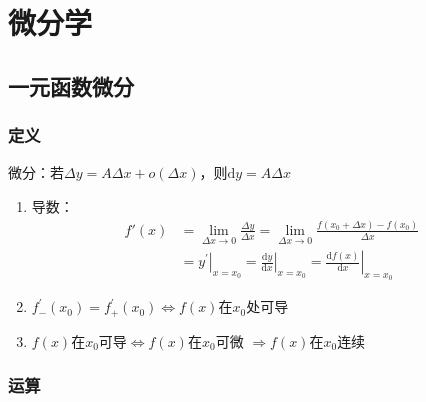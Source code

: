 \documentclass[12pt]{book}
\begin{document}
\chapter{微分学}

\section{一元函数微分}



\subsection{定义}

微分：若$\Delta y =A \Delta x +o(\Delta x) $，则$ \mathrm{d} y = A \Delta x $

\begin{enumerate}[1.]
    \item 导数：
          \begin{align*}
              f'(x) & = \lim_{\Delta x\rightarrow 0}{\frac{\Delta y}{\Delta x}} = \lim_{\Delta x\rightarrow 0}{\frac{f(x_0+\Delta x)-f(x_0)}{\Delta x}} \\
              & = \left.y^\prime \right|_{x=x_0}  
              =\left.\frac{\mathrm{d}y}{\mathrm{d}x} \right|_{x=x_0} = \left.\frac{\mathrm{d}f(x)}{\mathrm{d}x} \right|_{x=x_0}
          \end{align*}
    \item $f^\prime_{-}(x_0)=f^\prime_{+}(x_0)\Leftrightarrow f(x)$在$x_0$处可导
    \item $f(x)$在$x_0$可导$\Leftrightarrow f(x)$在$x_0$可微 $\Rightarrow f(x)$在$x_0$连续
\end{enumerate}


\subsection{运算}
\end{document}

